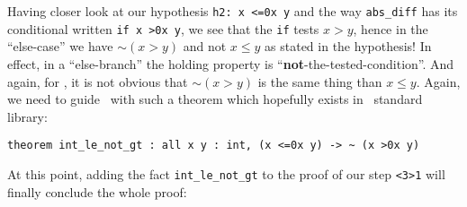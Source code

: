 \documentclass[11pt,a4paper,twoside,onecolumn,fullpage]{article}
\begin{document}
Having closer look at our hypothesis \lstinline"h2: x <=0x y" and the
way \lstinline"abs_diff" has its conditional written
\lstinline"if x >0x y", we see that the \lstinline"if" tests $x >y$,
hence in the ``else-case'' we have $\sim (x >y)$ and not $x \le y$ as
stated in the hypothesis! In effect, in a ``else-branch'' the holding
property is ``{\bf not}-the-tested-condition''. And again, for \zenon,
it is not obvious that $\sim (x >y)$ is the same thing than $x \le y$.
Again, we need to guide \zenon\ with such a theorem which hopefully
exists in \focal\ standard library:

{\scriptsize
\begin{lstlisting}
theorem int_le_not_gt : all x y : int, (x <=0x y) -> ~ (x >0x y)
\end{lstlisting}}

At this point, adding the fact \lstinline"int_le_not_gt" to the proof
of our step \lstinline"<3>1" will finally conclude the whole proof:

{\scriptsize
}






\end{document}
